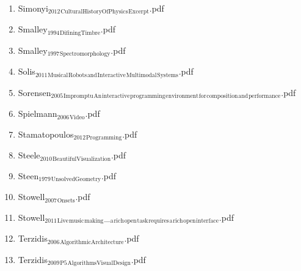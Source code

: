 \documentclass[11pt]{article}
\begin{document}
\begin{enumerate}
\begin{enumerate}
\begin{enumerate}
\begin{enumerate}
\begin{enumerate}
\item Simonyi$_{\text{2012}}$$_{\text{CulturalHistoryOfPhysics}}$$_{\text{Excerpt}}$.pdf
\label{sec-1-1-1-1-7-1-1-103}

\item Smalley$_{\text{1994}}$$_{\text{DifiningTimbre}}$.pdf
\label{sec-1-1-1-1-7-1-1-104}

\item Smalley$_{\text{1997}}$$_{\text{Spectromorphology}}$.pdf
\label{sec-1-1-1-1-7-1-1-105}

\item Solis$_{\text{2011}}$$_{\text{Musical}}$$_{\text{Robots}}$$_{\text{and}}$$_{\text{Interactive}}$$_{\text{Multimodal}}$$_{\text{Systems}}$.pdf
\label{sec-1-1-1-1-7-1-1-106}

\item Sorensen$_{\text{2005}}$$_{\text{Impromptu}}$$_{\text{An}}$$_{\text{interactive}}$$_{\text{programming}}$$_{\text{environment}}$$_{\text{for}}$$_{\text{composition}}$$_{\text{and}}$$_{\text{performance}}$.pdf
\label{sec-1-1-1-1-7-1-1-107}

\item Spielmann$_{\text{2006}}$$_{\text{Video}}$.pdf
\label{sec-1-1-1-1-7-1-1-108}

\item Stamatopoulos$_{\text{2012}}$$_{\text{Programming}}$.pdf
\label{sec-1-1-1-1-7-1-1-109}

\item Steele$_{\text{2010}}$$_{\text{BeautifulVisualization}}$.pdf
\label{sec-1-1-1-1-7-1-1-110}

\item Steen$_{\text{1979}}$$_{\text{UnsolvedGeometry}}$.pdf
\label{sec-1-1-1-1-7-1-1-111}

\item Stowell$_{\text{2007}}$$_{\text{Onsets}}$.pdf
\label{sec-1-1-1-1-7-1-1-112}

\item Stowell$_{\text{2011}}$$_{\text{Live}}$$_{\text{music}}$$_{\text{making}}$\_$_{\text{a}}$$_{\text{rich}}$$_{\text{open}}$$_{\text{task}}$$_{\text{requires}}$$_{\text{a}}$$_{\text{rich}}$$_{\text{open}}$$_{\text{interface}}$.pdf
\label{sec-1-1-1-1-7-1-1-113}

\item Terzidis$_{\text{2006}}$$_{\text{AlgorithmicArchitecture}}$.pdf
\label{sec-1-1-1-1-7-1-1-114}

\item Terzidis$_{\text{2009}}$$_{\text{P5}}$$_{\text{AlgorithmsVisualDesign}}$.pdf
\label{sec-1-1-1-1-7-1-1-115}


\end{enumerate}
\end{enumerate}
\end{enumerate}
\end{enumerate}
\end{enumerate}
\end{document}
